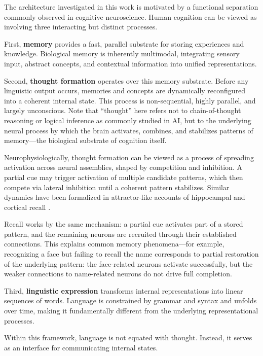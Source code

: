 \documentclass[11pt]{article}
\begin{document}
The architecture investigated in this work is motivated by a functional separation commonly observed in cognitive neuroscience. Human cognition can be viewed as involving three interacting but distinct processes.

First, \textbf{memory} provides a fast, parallel substrate for storing experiences and knowledge. Biological memory is inherently multimodal, integrating sensory input, abstract concepts, and contextual information into unified representations.

Second, \textbf{thought formation} operates over this memory substrate. Before any linguistic output occurs, memories and concepts are dynamically reconfigured into a coherent internal state. This process is non-sequential, highly parallel, and largely unconscious. Note that ``thought'' here refers not to chain-of-thought reasoning or logical inference as commonly studied in AI, but to the underlying neural process by which the brain activates, combines, and stabilizes patterns of memory---the biological substrate of cognition itself.

Neurophysiologically, thought formation can be viewed as a process of spreading activation across neural assemblies, shaped by competition and inhibition. A partial cue may trigger activation of multiple candidate patterns, which then compete via lateral inhibition until a coherent pattern stabilizes. Similar dynamics have been formalized in attractor-like accounts of hippocampal and cortical recall \citep{rolls2007attractor,rolls2013mechanisms,treves1994computational}.

Recall works by the same mechanism: a partial cue activates part of a stored pattern, and the remaining neurons are recruited through their established connections. This explains common memory phenomena---for example, recognizing a face but failing to recall the name corresponds to partial restoration of the underlying pattern: the face-related neurons activate successfully, but the weaker connections to name-related neurons do not drive full completion.

Third, \textbf{linguistic expression} transforms internal representations into linear sequences of words. Language is constrained by grammar and syntax and unfolds over time, making it fundamentally different from the underlying representational processes.

Within this framework, language is not equated with thought. Instead, it serves as an interface for communicating internal states.
\end{document}
